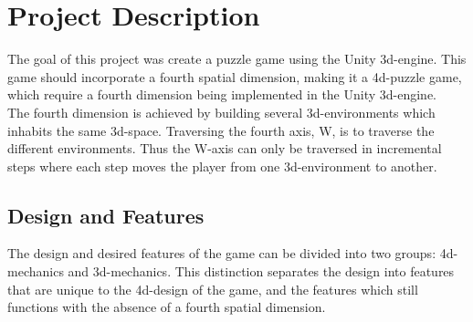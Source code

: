 \section{Project Description}
The goal of this project was create a puzzle game using the Unity 3d-engine. This game should incorporate a fourth spatial dimension, making it a 4d-puzzle game, which require a fourth dimension being implemented in the Unity 3d-engine.\\

The fourth dimension is achieved by building several 3d-environments which inhabits the same 3d-space. Traversing the fourth axis, W, is to traverse the different environments. Thus the W-axis can only be traversed in incremental steps where each step moves the player from one 3d-environment to another. 
\subsection{Design and Features}
The design and desired features of the game can be divided into two groups: 4d-mechanics and 3d-mechanics. This distinction separates the design into features that are unique to the 4d-design of the game, and the features which still functions with the absence of a fourth spatial dimension.
